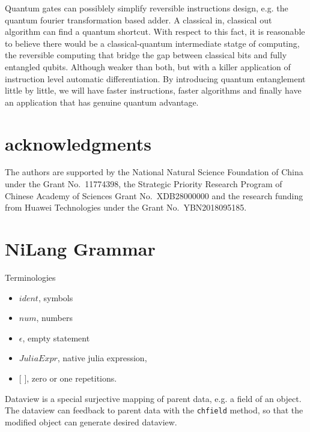 \documentclass[aps,twocolumn,longbibliography,english,superscriptaddress,prr]{revtex4-1}
\newcommand{\<}{\langle}
\renewcommand{\>}{\rangle}
\begin{document}
Quantum gates can possiblely simplify reversible instructions design, e.g. the quantum fourier transformation based adder.
A classical in, classical out algorithm can find a quantum shortcut.
With respect to this fact, it is reasonable to believe there would be a classical-quantum intermediate statge of computing,
the reversible computing that bridge the gap between classical bits and fully entangled qubits.
Although weaker than both, but with a killer application of instruction level automatic differentiation.
By introducing quantum entanglement little by little, we will have faster instructions, faster algorithms and finally have an application that has genuine quantum advantage.

\section{acknowledgments}
The authors are supported by the National Natural Science Foundation of China under the Grant No.~11774398, the Strategic Priority Research Program of Chinese Academy of Sciences Grant No.~XDB28000000 and the research funding from Huawei Technologies under the Grant No.~YBN2018095185.




\pagebreak
\appendix

\section{NiLang Grammar}\label{app:grammar}

Terminologies
\begin{itemize}
    \item $ident$, symbols
    \item $num$, numbers
    \item $\epsilon$, empty statement
    \item $JuliaExpr$, native julia expression,
    \item $[$ $]$,  zero or one repetitions.
\end{itemize}

\begin{minipage}{0.3\textwidth}
    \small

\end{minipage}

Dataview is a special surjective mapping of parent data, e.g. a field of an object.
The dataview can feedback to parent data with the 
\texttt{chfield} method, so that the modified object can generate desired dataview.
\end{document}
